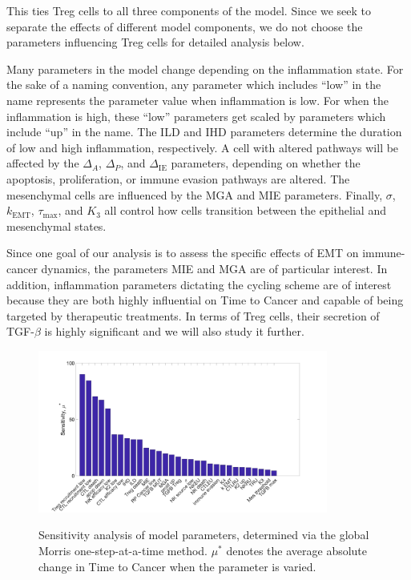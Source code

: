 \documentclass[11pt]{article}
\begin{document}
This ties Treg cells to all three components of the model.
Since we seek to separate the effects of different model components, we do not choose the parameters influencing Treg cells for detailed analysis below.
\par 
Many parameters in the model change depending on the inflammation state.
For the sake of a naming convention, any parameter which includes ``low'' in the name represents the parameter value when inflammation is low.
For when the inflammation is high, these ``low'' parameters get scaled by parameters which include ``up'' in the name.
The ILD and IHD parameters determine the duration of low and high inflammation, respectively.
A cell with altered pathways will be affected by the $\Delta_A$, $\Delta_P$, and $\Delta_{\text{IE}}$ parameters, depending on whether the apoptosis, proliferation, or immune evasion pathways are altered.
The mesenchymal cells are influenced by the MGA and MIE parameters.
Finally, $\sigma$, $k_\text{EMT}$, $\tau_\text{max}$, and $K_3$ all control how cells transition between the epithelial and mesenchymal states.

Since one goal of our analysis is to assess the specific effects of EMT on immune-cancer dynamics, the parameters MIE and MGA are of particular interest.
In addition, inflammation parameters dictating the cycling scheme are of interest because they are both highly influential on Time to Cancer and capable of being targeted by therapeutic treatments.
In terms of Treg cells, their secretion of TGF-$\beta$ is highly significant and we will also study it further.


\begin{figure}
\center
{\includegraphics[width=0.85\textwidth]{Figure2/MOAT.jpg}}
\caption{Sensitivity analysis of model parameters, determined via the global Morris one-step-at-a-time method. $\mu^*$ denotes the average absolute change in Time to Cancer when the parameter is varied.}
\label{fig:MOAT}
\end{figure}
\end{document}
